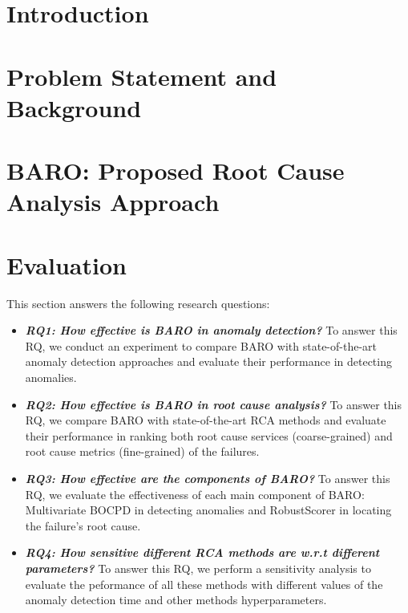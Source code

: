 \documentclass[acmsmall]{acmart}
\begin{document}



\maketitle


\section{Introduction}
\label{sec:introduction}



\section{Problem Statement and Background}
\label{sec:background}


\section{BARO: Proposed Root Cause Analysis Approach}
\label{sec:method}


\section{Evaluation}

This section answers the following research questions:
\begin{itemize}
    \item \textbf{\textit{RQ1: How effective is BARO in anomaly detection?}} To answer this RQ, we conduct an experiment to compare BARO with state-of-the-art anomaly detection approaches and evaluate their performance in detecting anomalies.
    \item \textbf{\textit{RQ2: How effective is BARO in root cause analysis?}} To answer this RQ, we compare BARO with state-of-the-art RCA methods and evaluate their performance in ranking both root cause services (coarse-grained) and root cause metrics (fine-grained) of the failures.
    \item \textit{\textbf{RQ3: How effective are the components of BARO?}} To answer this RQ, we evaluate the effectiveness of each main component of BARO: Multivariate BOCPD in detecting anomalies and RobustScorer in locating the failure's root cause.
    \item \textbf{\textit{RQ4: How sensitive different RCA methods are w.r.t different parameters?}} To answer this RQ, we perform a sensitivity analysis to evaluate the peformance of all these methods with different values of the anomaly detection time and other methods hyperparameters.
\end{itemize}
    
\end{document}
